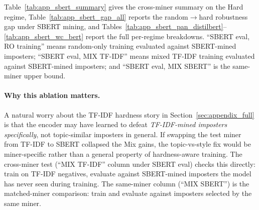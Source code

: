 \documentclass[11pt]{article}
\begin{document}
Table~\ref{tab:app_sbert_summary} gives the cross-miner summary on the Hard regime, Table~\ref{tab:app_sbert_gap_all} reports the random$\to$hard robustness gap under SBERT mining, and Tables~\ref{tab:app_sbert_pan_distilbert}--\ref{tab:app_sbert_wc_bert} report the full per-regime breakdowns. ``SBERT eval, RO training'' means random-only training evaluated against SBERT-mined imposters; ``SBERT eval, MIX TF-IDF'' means mixed TF-IDF training evaluated against SBERT-mined imposters; and ``SBERT eval, MIX SBERT'' is the same-miner upper bound.

\paragraph{Why this ablation matters.} A natural worry about the TF-IDF hardness story in Section~\ref{sec:appendix_full} is that the encoder may have learned to defeat \emph{TF-IDF-mined imposters specifically}, not topic-similar imposters in general. If swapping the test miner from TF-IDF to SBERT collapsed the Mix gains, the topic-vs-style fix would be miner-specific rather than a general property of hardness-aware training. The cross-miner test (``MIX TF-IDF'' column under SBERT eval) checks this directly: train on TF-IDF negatives, evaluate against SBERT-mined imposters the model has never seen during training. The same-miner column (``MIX SBERT'') is the matched-miner comparison: train and evaluate against imposters selected by the same miner.
\end{document}
